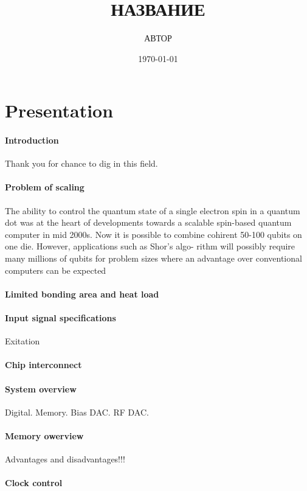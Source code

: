 \documentclass[a4paper,12pt]{article} %
\author{АВТОР }
\title{НАЗВАНИЕ}
\date{\today}
\begin{document}

\section{Presentation}
\paragraph{Introduction}
Thank you for chance to dig in this field.

\paragraph{Problem of scaling}
The ability to control the quantum state of a single electron spin in a quantum dot was at the heart of developments
towards a scalable spin-based quantum computer in mid 2000s. Now it is possible to combine cohirent 50-100 qubits on one die. However, applications such as Shor’s algo-
rithm will possibly require many millions of qubits for problem sizes where an advantage over conventional computers can be expected


\paragraph{Limited bonding area and heat load}
\paragraph{Input signal specifications} Exitation
\paragraph{Chip interconnect}

\paragraph{System overview} Digital. Memory. Bias DAC. RF DAC.
\paragraph{Memory owerview}
Advantages and disadvantages!!!
\paragraph{Clock control}
\end{document}
